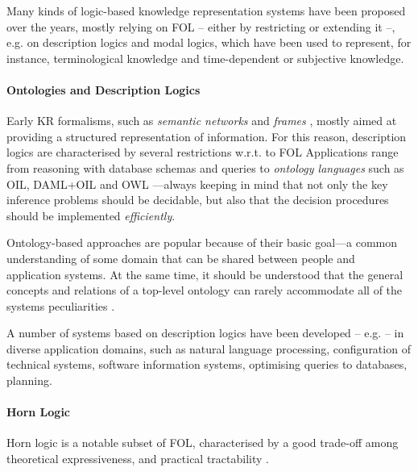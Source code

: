 \documentclass[12pt,a4paper,openright,twoside]{book}
\begin{document}
Many kinds of logic-based knowledge representation systems have been proposed over the years, mostly relying on FOL -- either by restricting or extending it --, e.g. on description logics and modal logics, which have been used to represent, for instance, terminological knowledge and time-dependent or subjective knowledge.

\paragraph{Ontologies and Description Logics}

Early KR formalisms, such as \emph{semantic networks} and \emph{frames} \cite{sowa2014}, mostly aimed at providing a structured representation of information.
%
For this reason, description logics are characterised by several restrictions w.r.t. to FOL
%
Applications range from reasoning with database schemas and queries \cite{artale2002} to \emph{ontology languages} such as OIL, DAML+OIL and OWL \cite{horrocks2005}---always keeping in mind that not only the key inference problems should be decidable, but also that the decision procedures should be implemented \emph{efficiently}.

Ontology-based approaches are popular because of their basic goal---a common understanding of some domain that can be shared between people and application systems.
%
At the same time, it should be understood that the general concepts and relations of a top-level ontology can rarely accommodate all of the systems peculiarities \cite{van2008,valente2005}.

A number of systems based on description logics have been developed -- e.g. \cite{cohen1994,moller2003} -- in diverse application domains, such as natural language processing, configuration of technical systems, software information systems, optimising queries to databases, planning.

\paragraph{Horn Logic}

Horn logic is a notable subset of FOL, characterised by a good trade-off among theoretical expressiveness, and practical tractability \cite{Makowsky1987}.
\end{document}
